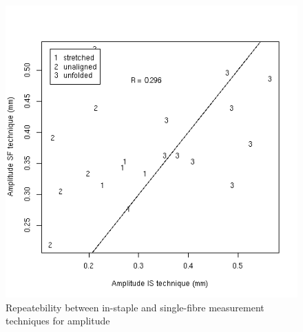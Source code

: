 %

\begin{figure}[!h]
  \centering
  \includegraphics[width=1.0\textwidth]{figreptyampl.png}
  \caption{Repeatebility between in-staple and single-fibre measurement techniques for amplitude}
  \label{fig:reptyampl}
\end{figure}

%

